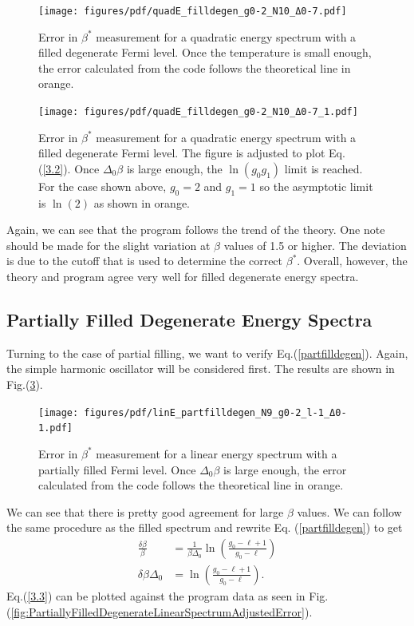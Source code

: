 \begin{figure}[H]
    \centering
    \texttt{[image: figures/pdf/quadE\_filldegen\_g0-2\_N10\_Δ0-7.pdf]}
    \caption{Error in $\beta^*$ measurement for a quadratic energy spectrum with a filled
degenerate Fermi level. Once the temperature is small enough, the error calculated from the code
follows the theoretical line in orange.}
    \label{fig:FilledDegenerate}
\end{figure}

\begin{figure}[H]
    \centering
    \texttt{[image: figures/pdf/quadE\_filldegen\_g0-2\_N10\_Δ0-7\_1.pdf]}
    \caption{Error in $\beta^*$ measurement for a quadratic energy spectrum with a filled
degenerate Fermi level. The figure is adjusted to plot Eq.\@ (\ref{3.2}). Once $\Delta_0\beta$ is large enough, the $\ln(g_0g_1)$ limit is reached. For the case shown above, $g_0=2$ and $g_1=1$ so the asymptotic limit is $\ln(2)$ as shown in orange.}
    \label{fig:FilledDegenerate2}
\end{figure}
Again, we can see that the program follows the trend of the theory. One note should be made for the slight variation at $\beta$ values of 1.5 or higher. The deviation is due to the cutoff that is used to determine the correct $\beta^*$. Overall, however, the theory and program agree very well for filled degenerate energy spectra.

\subsection{Partially Filled Degenerate Energy Spectra}
Turning to the case of partial filling, we want to verify Eq.\@ (\ref{partfilldegen}). Again, the simple harmonic oscillator will be considered first. The results are shown in Fig.\@ (\ref{fig:PartiallyFilledDegenerateLinearSpectrum}). 

\begin{figure}[H]
    \centering
    \texttt{[image: figures/pdf/linE\_partfilldegen\_N9\_g0-2\_l-1\_Δ0-1.pdf]}
    \caption{Error in $\beta^*$ measurement for a linear energy spectrum with a partially filled Fermi level. Once $\Delta_0\beta$ is large enough, the error calculated from the code follows the theoretical line in orange.}
    \label{fig:PartiallyFilledDegenerateLinearSpectrum}
\end{figure}

We can see that there is pretty good agreement for large $\beta$ values. We can follow the same procedure as the filled spectrum and rewrite Eq. (\ref{partfilldegen}) to get
\begin{align}
    \frac{\delta\beta}{\beta}&=\frac{1}{\beta\Delta_0}\ln(\frac{g_0-\ell+1}{g_0-\ell})\nonumber\\
    \delta\beta \Delta_0&=\ln(\frac{g_0-\ell+1}{g_0-\ell}). \label{3.3}
\end{align}
Eq.\@ (\ref{3.3}) can be plotted against the program data as seen in Fig. (\ref{fig:PartiallyFilledDegenerateLinearSpectrumAdjustedError}). 

